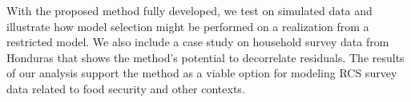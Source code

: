 
With the proposed method fully developed, we test on simulated data and illustrate how model selection might be performed on a realization from a restricted model. We also include a case study on household survey data from Honduras that shows the method's potential to decorrelate residuals. The results of our analysis support the method as a viable option for modeling RCS survey data related to food security and other contexts.


